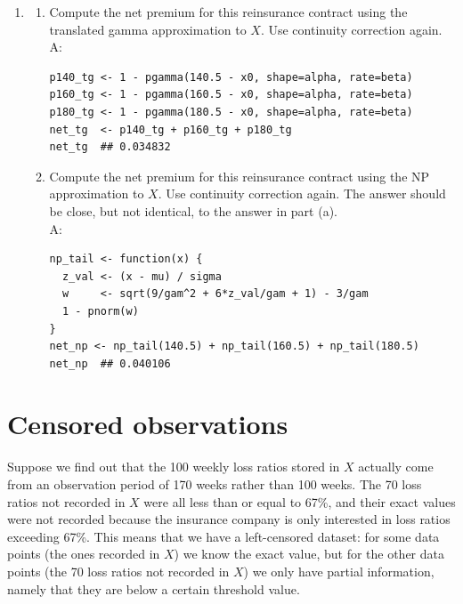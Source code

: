 \documentclass{article}
\begin{document}
\begin{enumerate}
  \item[$\boldsymbol{Q_8}$]
  \begin{enumerate}
    \item[(a)] Compute the net premium for this reinsurance contract using the translated gamma approximation to $X$. Use continuity correction again. \\A:

\begin{lstlisting}
p140_tg <- 1 - pgamma(140.5 - x0, shape=alpha, rate=beta)
p160_tg <- 1 - pgamma(160.5 - x0, shape=alpha, rate=beta)
p180_tg <- 1 - pgamma(180.5 - x0, shape=alpha, rate=beta)
net_tg  <- p140_tg + p160_tg + p180_tg
net_tg  ## 0.034832
\end{lstlisting}

    \item[(b)] Compute the net premium for this reinsurance contract using the NP approximation to $X$. Use continuity correction again. The answer should be close, but not identical, to the answer in part (a). \\A:

\begin{lstlisting}
np_tail <- function(x) {
  z_val <- (x - mu) / sigma
  w     <- sqrt(9/gam^2 + 6*z_val/gam + 1) - 3/gam
  1 - pnorm(w)
}
net_np <- np_tail(140.5) + np_tail(160.5) + np_tail(180.5)
net_np  ## 0.040106
\end{lstlisting}
  \end{enumerate}
\end{enumerate}

\newpage
\section{Censored observations}
Suppose we find out that the 100 weekly loss ratios stored in $X$ actually come from an observation period of 170 weeks rather than 100 weeks. The 70 loss ratios not recorded in $X$ were all less than or equal to 67\%, and their exact values were not recorded because the insurance company is only interested in loss ratios exceeding 67\%. This means that we have a left-censored dataset: for some data points (the ones recorded in $X$) we know the exact value, but for the other data points (the 70 loss ratios not recorded in $X$) we only have partial information, namely that they are below a certain threshold value.
\end{document}
